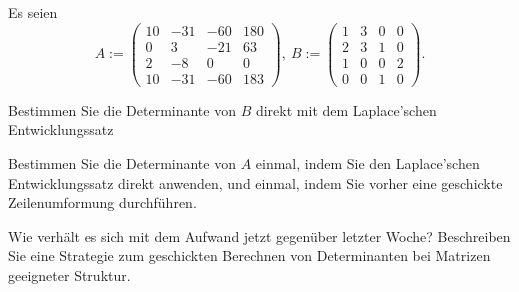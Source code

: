 \begin{Problem}
	Es seien
	\[
		A:=\begin{pmatrix} 10 & -31 & -60 & 180 \\ 0 & 3 & -21 & 63 \\ 2 & -8 & 0 & 0 \\ 10 & -31 & -60 & 183 \end{pmatrix},~B:=\begin{pmatrix} 1 & 3 & 0 & 0 \\ 2 & 3 & 1 & 0 \\ 1 & 0 & 0 & 2 \\ 0 & 0 & 1 & 0 \end{pmatrix} 
	.\] 
	\begin{parts}
		\item Bestimmen Sie die Determinante von $B$ direkt mit dem Laplace’schen Entwicklungssatz  
		\item Bestimmen Sie die Determinante von $A$ einmal, indem Sie den Laplace’schen Entwicklungssatz direkt anwenden, und einmal, indem Sie vorher eine geschickte Zeilenumformung durchführen.   
		\item Wie verhält es sich mit dem Aufwand jetzt gegenüber letzter Woche? Beschreiben Sie eine Strategie zum geschickten Berechnen von Determinanten bei Matrizen geeigneter Struktur.  
	\end{parts}
\end{Problem}
